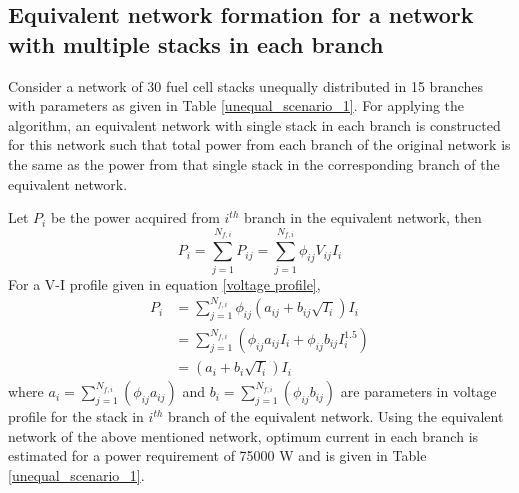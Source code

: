 \documentclass[twocolumn]{autart}
\begin{document}
\subsection{Equivalent network formation for a network with multiple stacks in each branch}
Consider a network of 30 fuel cell stacks unequally distributed in 15 branches with parameters as given in Table \ref{unequal_scenario_1}. For applying the algorithm, an equivalent network with single stack in each branch is constructed for this network such that total power from each branch of the original network is the same as the power from that single stack in the corresponding branch of the equivalent network.

Let $P_{i}$ be the power acquired from $i^{th}$ branch in the equivalent network, then
\begin{equation}
P_i = \sum_{j=1}^{N_{f,i}} P_{ij} =\sum_{j=1}^{N_{f,i}}  \phi_{ij}V_{ij}I_i
\end{equation}
For a V-I profile given in equation \eqref{voltage profile}, 
\begin{align}
P_i &= \sum_{j=1}^{N_{f,i}}  \phi_{ij} (a_{ij} + b_{ij} \sqrt{I_i}) I_i\\
&= \sum_{j=1}^{N_{f,i}}  (\phi_{ij}a_{ij}I_i + \phi_{ij}b_{ij} I_i^{1.5})\\
&= (a_i + b_i \sqrt{I_i}) I_i
\end{align}
where $a_i = \sum_{j=1}^{N_{f,i}}  (\phi_{ij}a_{ij})$ and $b_i = \sum_{j=1}^{N_{f,i}}  (\phi_{ij}b_{ij})$ are parameters in voltage profile for the stack in $i^{th}$ branch of the equivalent network. Using the equivalent network of the above mentioned network, optimum current in each branch is estimated for a power requirement of 75000 W and is given in Table \ref{unequal_scenario_1}. 
\end{document}
